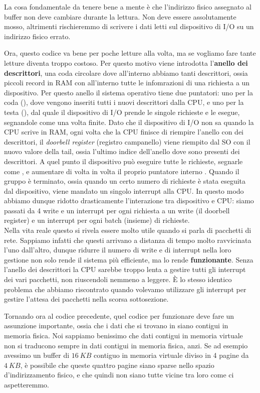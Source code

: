\documentclass[11pt, a4paper, titlepage, oneside]{scrbook}
\begin{document}
La cosa fondamentale da tenere bene a mente è che l'indirizzo fisico assegnato al buffer  non deve cambiare durante la lettura. Non deve essere assolutamente mosso, altrimenti rischieremmo di scrivere i dati letti sul dispositivo di I/O su un indirizzo fisico errato.

Ora, questo codice va bene per poche letture alla volta, ma se vogliamo fare tante letture diventa troppo costoso. Per questo motivo viene introdotta l'\textbf{anello dei descrittori}, una coda circolare dove all'interno abbiamo tanti descrittori, ossia piccoli record in RAM con all'interno tutte le infomrazioni di una richiesta a un dispositivo. Per questo anello il sistema operativo tiene due puntatori: uno per la coda (), dove vengono inseriti tutti i nuovi descrittori dalla CPU, e uno per la testa (), dal quale il dispositivo di I/O prende le singole richieste e le esegue, segnandole come  una volta finite. Dato che il dispositivo di I/O non sa quando la CPU scrive in RAM, ogni volta che la CPU finisce di riempire l'anello con dei descrittori, il \textit{doorbell register} (registro campanello) viene riempito dal SO con il nuovo valore della tail, ossia l'ultimo indice dell'anello dove sono presenti dei descrittori. A quel punto il dispositivo può eseguire tutte le richieste, segnarle come , e aumentare di volta in volta il proprio puntatore interno . Quando il gruppo è terminato, ossia quando un certo numero di richieste è stata eseguita dal dispositivo, viene mandato un singolo interrupt alla CPU. In questo modo abbiamo dunque ridotto drasticamente l'interazione tra dispositivo e CPU: siamo passati da 4 write e un interrupt per ogni richiesta a un write (il doorbell register) e un interrupt per ogni batch (insieme) di richieste. \\
Nella vita reale questo si rivela essere molto utile quando si parla di pacchetti di rete. Sappiamo infatti che questi arrivano a distanza di tempo molto ravvicinata l'uno dall'altro, dunque ridurre il numero di write e di interrupt nella loro gestione non solo rende il sistema più efficiente, ma lo rende \textbf{funzionante}. Senza l'anello dei descrittori la CPU sarebbe troppo lenta a gestire tutti gli interrupt dei vari pacchetti, non riuscendoli nemmeno a leggere. È lo stesso identico problema che abbiamo riscontrato quando volevamo utilizzare gli interrupt per gestire l'attesa dei pacchetti nella scorsa sottosezione.

Tornando ora al codice precedente, quel codice per funzionare deve fare un assunzione importante, ossia che i dati che si trovano in  siano contigui in memoria fisica. Noi sappiamo benissimo che dati contigui in memoria virtuale non si traducono sempre in dati contigui in memoria fisica, anzi. Se ad esempio avessimo un buffer di $\SI{16}{KB}$ contiguo in memoria virtuale diviso in 4 pagine da $\SI{4}{KB}$, è possibile che queste quattro pagine siano sparse nello spazio d'indirizzamento fisico, e che quindi non siano tutte vicine tra loro come ci aspetteremmo. 
\end{document}
